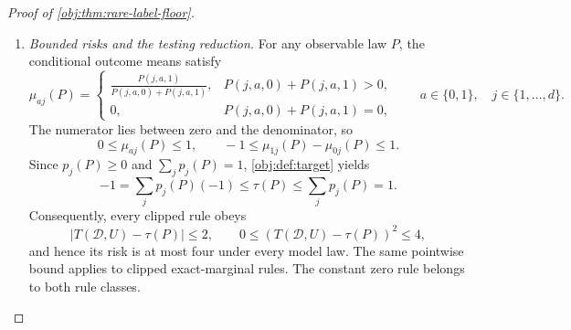 \begin{proof}[Proof of \cref{obj:thm:rare-label-floor}]
\begin{enumerate}
By \cref{obj:ass:data-product}, the augmented observation laws for the
original-record experiment are
\[
\mathsf P_{\mathrm{ann},\pm}
:=
\bigl(\mathsf P_{\mathrm{lab},\pm}
      \otimes\pi_{XA}^{\otimes m}\bigr)
\otimes\mathrm{Uniform}[0,1].
\]
First removing the common seed factor and then the common auxiliary
factor gives
\[
\begin{aligned}
\operatorname{TV}
(\mathsf P_{\mathrm{ann},+},\mathsf P_{\mathrm{ann},-})
&=
\operatorname{TV}
\bigl(
\mathsf P_{\mathrm{lab},+}\otimes\pi_{XA}^{\otimes m},
\mathsf P_{\mathrm{lab},-}\otimes\pi_{XA}^{\otimes m}
\bigr)\\
&=
\operatorname{TV}
(\mathsf P_{\mathrm{lab},+},\mathsf P_{\mathrm{lab},-})
\le\frac14.
\end{aligned}
\]
For \(m=0\), the auxiliary array space consists of the empty array and its
law is a point mass, so the same argument applies.

\item \textit{Bounded risks and the testing reduction.}
For any observable law \(P\), the conditional outcome means satisfy
\begingroup\small
\[
\mu_{aj}(P)=
\begin{cases}
\displaystyle
\frac{P(j,a,1)}{P(j,a,0)+P(j,a,1)},
& P(j,a,0)+P(j,a,1)>0,\\[6pt]
0,&P(j,a,0)+P(j,a,1)=0,
\end{cases}
\qquad a\in\{0,1\},\quad j\in\{1,\ldots,d\}.
\]
\endgroup
The numerator lies between zero and the denominator, so
\[
0\le\mu_{aj}(P)\le1,
\qquad
-1\le\mu_{1j}(P)-\mu_{0j}(P)\le1.
\]
Since \(p_j(P)\ge0\) and \(\sum_jp_j(P)=1\),
\cref{obj:def:target} yields
\[
-1
=
\sum_jp_j(P)(-1)
\le\tau(P)
\le
\sum_jp_j(P)
=1.
\]
Consequently, every clipped rule obeys
\[
|T(\mathcal D,U)-\tau(P)|\le2,
\qquad
0\le(T(\mathcal D,U)-\tau(P))^2\le4,
\]
and hence its risk is at most four under every model law. The same
pointwise bound applies to clipped exact-marginal rules. The constant
zero rule belongs to both rule classes.


\end{enumerate}
\end{proof}
